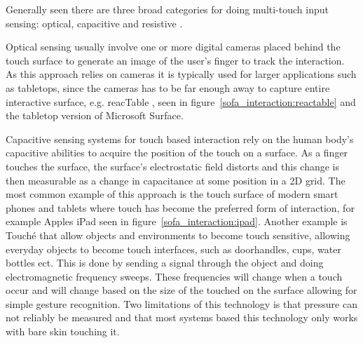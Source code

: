 Generally seen there are three broad categories for doing multi-touch input sensing: optical, capacitive and resistive \citep{rosenberg2009unmousepad}.

Optical sensing usually involve one or more digital cameras placed behind the touch surface to generate an image of the user's finger to track the interaction.
As this approach relies on cameras it is typically used for larger applications such as tabletops, since the cameras has to be far enough away to capture entire interactive surface, e.g. reacTable \citep{jorda2007reactable}, seen in figure~\ref{sofa_interaction:reactable} and the tabletop version of Microsoft Surface.

Capacitive sensing systems for touch based interaction rely on the human body's capacitive abilities to acquire the position of the touch on a surface. 
As a finger touches the surface, the surface's electrostatic field distorts and this change is then measurable as a change in capacitance at some position in a 2D grid.
The most common example of this approach is the touch surface of modern smart phones and tablets where touch has become the preferred form of interaction, for example Apples iPad seen in figure~\ref{sofa_interaction:ipad}.
Another example is Touch\'e \citep{sato2012touche} that allow objects and environments to become touch sensitive, allowing everyday objects to become touch interfaces, such as doorhandles, cups, water bottles ect.
This is done by sending a signal through the object and doing electromagnetic frequency sweeps. 
These frequencies will change when a touch occur and will change based on the size of the touched on the surface allowing for simple gesture recognition.
Two limitations of this technology is that pressure can not reliably be measured and that most systems based this technology only works with bare skin touching it.    


